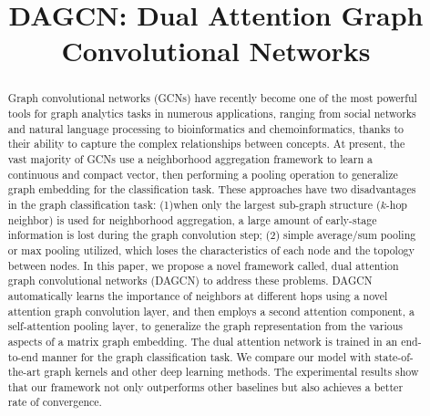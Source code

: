 \documentclass[conference]{IEEEtran}
\begin{document}
\title{DAGCN: Dual Attention Graph Convolutional Networks}

\author{
}


\maketitle

	\begin{abstract}
        Graph convolutional networks (GCNs) have recently become one of the most powerful tools for graph analytics tasks in numerous applications, ranging from social networks and natural language processing to bioinformatics and chemoinformatics, thanks to their ability to capture the complex relationships between concepts. At present, the vast majority of GCNs use a neighborhood aggregation framework to learn a continuous and compact vector, then performing a pooling operation to generalize graph embedding for the classification task. These approaches have two disadvantages in the graph classification task: (1)when only the largest sub-graph structure ($k$-hop neighbor) is used for neighborhood aggregation, a large amount of early-stage information is lost during the graph convolution step; (2) simple average/sum pooling or max pooling utilized, which loses the characteristics of each node and the topology between nodes. In this paper, we propose a novel framework called, dual attention graph convolutional networks (DAGCN) to address these problems. DAGCN automatically learns the importance of neighbors at different hops using a novel attention graph convolution layer, and then employs a second attention component, a  self-attention pooling layer, to generalize the graph representation from the various aspects of a matrix graph embedding. The dual attention network is trained in an end-to-end manner for the graph classification task. We compare our model with state-of-the-art graph kernels and other deep learning methods. The experimental results show that our framework not only outperforms other baselines but also achieves a better rate of convergence.
	\end{abstract}
\end{document}
